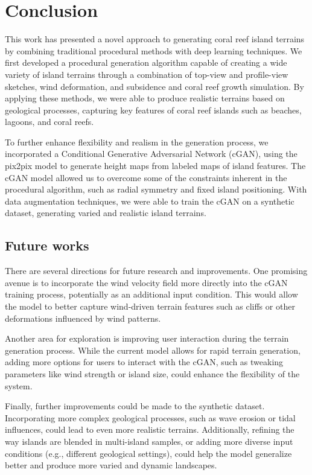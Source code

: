 \section{Conclusion}

This work has presented a novel approach to generating coral reef island terrains by combining traditional procedural methods with deep learning techniques. We first developed a procedural generation algorithm capable of creating a wide variety of island terrains through a combination of top-view and profile-view sketches, wind deformation, and subsidence and coral reef growth simulation. By applying these methods, we were able to produce realistic terrains based on geological processes, capturing key features of coral reef islands such as beaches, lagoons, and coral reefs.

To further enhance flexibility and realism in the generation process, we incorporated a Conditional Generative Adversarial Network (cGAN), using the pix2pix model to generate height maps from labeled maps of island features. The cGAN model allowed us to overcome some of the constraints inherent in the procedural algorithm, such as radial symmetry and fixed island positioning. With data augmentation techniques, we were able to train the cGAN on a synthetic dataset, generating varied and realistic island terrains.


\subsection{Future works}

There are several directions for future research and improvements. One promising avenue is to incorporate the wind velocity field more directly into the cGAN training process, potentially as an additional input condition. This would allow the model to better capture wind-driven terrain features such as cliffs or other deformations influenced by wind patterns.

Another area for exploration is improving user interaction during the terrain generation process. While the current model allows for rapid terrain generation, adding more options for users to interact with the cGAN, such as tweaking parameters like wind strength or island size, could enhance the flexibility of the system.

Finally, further improvements could be made to the synthetic dataset. Incorporating more complex geological processes, such as wave erosion or tidal influences, could lead to even more realistic terrains. Additionally, refining the way islands are blended in multi-island samples, or adding more diverse input conditions (e.g., different geological settings), could help the model generalize better and produce more varied and dynamic landscapes.



